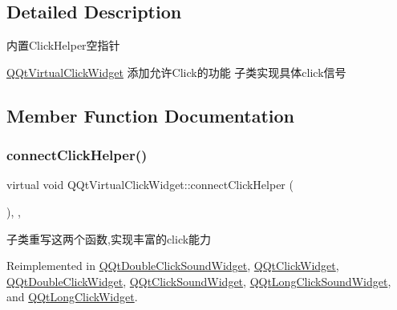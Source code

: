 \subsection{Detailed Description}
内置\+Click\+Helper空指针

\mbox{\hyperlink{class_q_qt_virtual_click_widget}{Q\+Qt\+Virtual\+Click\+Widget}} 添加允许\+Click的功能 子类实现具体click信号 

\subsection{Member Function Documentation}
\mbox{\label{class_q_qt_virtual_click_widget_a2e9874c5ec5aba763426dcacb012d7a7}} 
\subsubsection{\texorpdfstring{connect\+Click\+Helper()}{connectClickHelper()}}
{\footnotesize\ttfamily virtual void Q\+Qt\+Virtual\+Click\+Widget\+::connect\+Click\+Helper (\begin{DoxyParamCaption}{ }\end{DoxyParamCaption})\hspace{0.3cm}{\ttfamily [inline]}, {\ttfamily [protected]}, {\ttfamily [virtual]}}

子类重写这两个函数,实现丰富的click能力 

Reimplemented in \mbox{\hyperlink{class_q_qt_double_click_sound_widget_a96be7b2c78a6454f37cf585a18dbd0d9}{Q\+Qt\+Double\+Click\+Sound\+Widget}}, \mbox{\hyperlink{class_q_qt_click_widget_ad70931a1404abafddd82679cd3b7c414}{Q\+Qt\+Click\+Widget}}, \mbox{\hyperlink{class_q_qt_double_click_widget_a5518af71ca2e9a7d7d1230faeb78015d}{Q\+Qt\+Double\+Click\+Widget}}, \mbox{\hyperlink{class_q_qt_click_sound_widget_abca5602ca11fd5d9f6a4f26d8248e702}{Q\+Qt\+Click\+Sound\+Widget}}, \mbox{\hyperlink{class_q_qt_long_click_sound_widget_a2fe9da353776d801101f849a1c8f5b51}{Q\+Qt\+Long\+Click\+Sound\+Widget}}, and \mbox{\hyperlink{class_q_qt_long_click_widget_acd01d09ecce47c27d46173fe552799cb}{Q\+Qt\+Long\+Click\+Widget}}.

\mbox{\label{class_q_qt_virtual_click_widget_a9c406a5a5b2a82cd2709453cf4e5be89}} 
